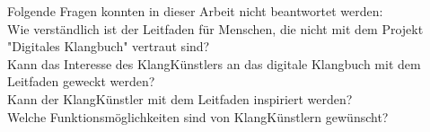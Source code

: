 Folgende Fragen konnten in dieser Arbeit nicht beantwortet werden:\\

Wie verständlich ist der Leitfaden für Menschen, die nicht mit dem Projekt "Digitales Klangbuch" vertraut sind?\\
Kann das Interesse des KlangKünstlers an das digitale Klangbuch mit dem Leitfaden geweckt werden?\\
Kann der KlangKünstler mit dem Leitfaden inspiriert werden?\\
Welche Funktionsmöglichkeiten sind von KlangKünstlern gewünscht?\\












